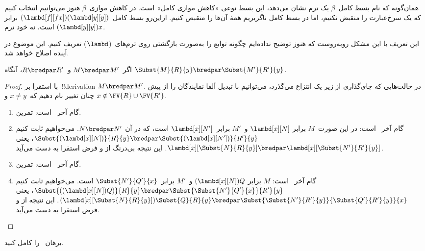 \documentclass[../../../include/open-logic-section]{subfiles}
\begin{document}
همان‌گونه که نام بسط کامل~$\beta$ یک ترم نشان می‌دهد، این بسط نوعی
«کاهش موازی کامل» است. در کاهش موازی~$\beta$ هنوز می‌توانیم انتخاب کنیم
که یک سرخ‌عبارت را منقبض نکنیم، اما در بسط کامل ناگزیریم همهٔ آن‌ها را
منقبض کنیم. ازاین‌رو بسط کامل~$(\lambd[f][fx])(\lambd[y][y])$ برابر
$(\lambd[y][y])x$ است، نه خود ترم.

\begin{editorial}
  این تعریف با این مشکل روبه‌روست که هنوز توضیح نداده‌ایم چگونه توابع
  را به‌صورت بازگشتی روی ترم‌های~($\lambd$) تعریف کنیم. این موضوع در
  آینده اصلاح خواهد شد.
\end{editorial}

\begin{lem}
  اگر~$M \bredpar M'$ و~$R \bredpar R'$، آنگاه
  $\Subst{M}{R}{y} \bredpar \Subst{M'}{R'}{y}$.
\end{lem}

\begin{proof}
  با استقرا بر~!!{derivation}ِ $M \bredpar M'$. در حالت‌هایی که
  جای‌گذاری از زیر یک انتزاع می‌گذرد، می‌توانیم با تبدیل آلفا نمایندگان
  را از پیش چنان تغییر نام دهیم که~$x \neq y$ و
  $x \notin \FV{R} \cup \FV{R'}$.
  \begin{enumerate}
    \item گام آخر~ است: تمرین.
    \item گام آخر~ است: در این صورت~$M$ برابر
      $\lambd[x][N]$ و~$M'$ برابر~$\lambd[x][N']$ است، که در آن
      $N \bredpar N'$. می‌خواهیم ثابت کنیم
      $\Subst{(\lambd[x][N])}{R}{y} \bredpar
      \Subst{(\lambd[x][N'])}{R'}{y}$، یعنی
      $\lambd[x][\Subst{N}{R}{y}] \bredpar
      \lambd[x][\Subst{N'}{R'}{y}]$. این نتیجه بی‌درنگ از
       و فرض استقرا به دست می‌آید.
    \item گام آخر~ است: تمرین.
    \item گام آخر~ است: $M$ برابر
      $(\lambd[x][N])Q$ و~$M'$ برابر~$\Subst{N'}{Q'}{x}$ است.
      می‌خواهیم ثابت کنیم
      $\Subst{((\lambd[x][N])Q)}{R}{y} \bredpar
      \Subst{\Subst{N'}{Q'}{x}}{R'}{y}$، یعنی
      $(\lambd[x][\Subst{N}{R}{y}])\Subst{Q}{R}{y} \bredpar
      \Subst{\Subst{N'}{R'}{y}}{\Subst{Q'}{R'}{y}}{x}$. این نتیجه از
       و فرض استقرا به دست می‌آید.
  \end{enumerate}
\end{proof}

\begin{prob}
  برهان~ را کامل کنید.
\end{prob}
\end{document}
